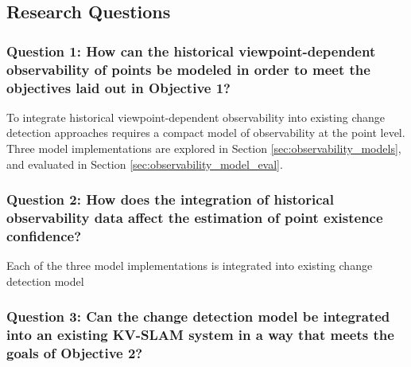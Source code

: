 \subsection{Research Questions}

\subsubsection*{Question 1: How can the historical viewpoint-dependent observability of points be modeled in order to meet the objectives laid out in Objective 1?}

To integrate historical viewpoint-dependent observability into existing change detection approaches requires a compact model of observability at the point level. Three model implementations are explored in Section \ref{sec:observability_models}, and evaluated in Section \ref{sec:observability_model_eval}.

\subsubsection*{Question 2: How does the integration of historical observability data affect the estimation of point existence confidence?}

Each of the three model implementations is integrated into existing change detection model

\subsubsection*{Question 3: Can the change detection model be integrated into an existing KV-SLAM system in a way that meets the goals of Objective 2?}